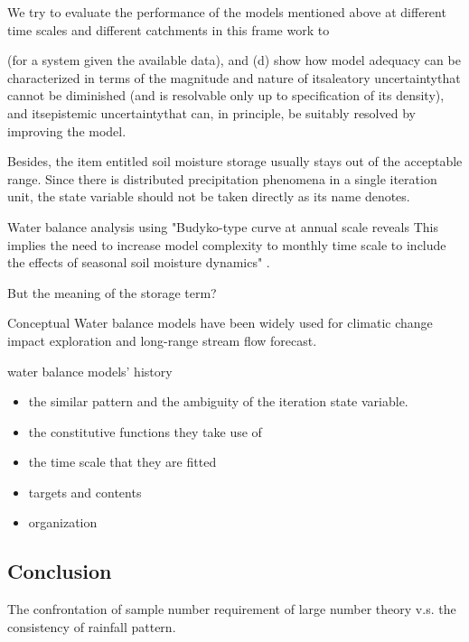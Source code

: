  We try to evaluate the performance of the models mentioned above at different time scales and different catchments in this frame work to 




 (for a system given the available data), and
(d) show how model adequacy can be characterized in terms of the magnitude and nature of
itsaleatory uncertaintythat cannot be diminished (and is resolvable only up to specification
of its density), and itsepistemic uncertaintythat can, in principle, be suitably resolved by
improving the model. 



 Besides, the item entitled soil moisture storage usually stays out of the acceptable range. Since there is distributed precipitation phenomena in a single iteration unit, the state variable should not be taken directly as its name denotes.




 Water balance analysis using  
"Budyko-type curve at annual scale reveals  This implies the need to increase model complexity to monthly time scale to include the effects of seasonal soil moisture dynamics" .

But the meaning of the storage term?



Conceptual Water balance models have been widely used for climatic change impact exploration and long-range stream flow forecast.

water balance models' history


\begin{itemize}
\item the similar pattern and the ambiguity of the iteration state variable.
\item the constitutive functions they take use of
\item the time scale that they are fitted

\item targets and contents
\item organization
\end{itemize}

\newpage
\begin{center}
\section{Conclusion}
\end{center}



 The confrontation of sample number requirement of large number theory v.s. the consistency of rainfall pattern.

\fi


 
 
 
